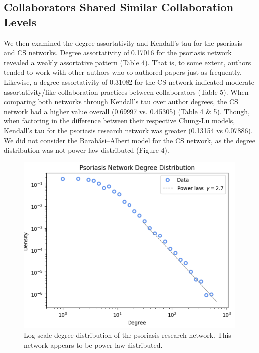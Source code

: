 \documentclass[9pt,twocolumn,twoside]{pnas-new}
\begin{document}
\subsection*{Collaborators Shared Similar Collaboration Levels} We then examined the degree assortativity and Kendall's tau for the psoriasis and CS networks. Degree assortativity of 0.17016 for the psoriasis network revealed a weakly assortative pattern (Table 4). That is, to some extent, authors tended to work with other authors who co-authored papers just as frequently. Likewise, a degree assortativity of 0.31082 for the CS network indicated moderate assortativity/like collaboration practices between collaborators (Table 5). When comparing both networks through Kendall's tau over author degrees, the CS network had a higher value overall (0.69997 vs. 0.45305) (Table 4 \& 5). Though, when factoring in the difference between their respective Chung-Lu models, Kendall's tau for the psoriasis research network was greater (0.13154 vs 0.07886). We did not consider the Barabási–Albert model for the CS network, as the degree distribution was not power-law distributed (Figure 4).
\begin{figure}[H]
    \centering
        \includegraphics[width=0.32\textheight]{powerlawPsoriasis.png}
    \caption{Log-scale degree distribution of the psoriasis research network. This network appears to be power-law distributed.}
    \label{fig:powerlawPsoriasis}
\end{figure}
\end{document}
